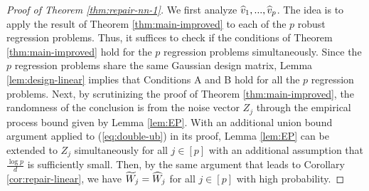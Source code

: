 \begin{proof}[Proof of Theorem \ref{thm:repair-nn-1}]
We first analyze $\widehat{v}_1,...,\widehat{v}_p$. The idea is to apply the result of Theorem \ref{thm:main-improved} to each of the $p$ robust regression problems. Thus, it suffices to check if the conditions of Theorem \ref{thm:main-improved} hold for the $p$ regression problems simultaneously. Since the $p$ regression problems share the same Gaussian design matrix, Lemma \ref{lem:design-linear} implies that Conditions A and B hold for all the $p$ regression problems. Next, by scrutinizing the proof of Theorem \ref{thm:main-improved}, the randomness of the conclusion is from the noise vector $Z_j$ through the empirical process bound given by Lemma \ref{lem:EP}. With an additional union bound argument applied to (\ref{eq:double-ub}) in its proof, Lemma \ref{lem:EP} can be extended to $Z_j$ simultaneously for all $j\in[p]$ with an additional assumption that $\frac{\log p}{d}$ is sufficiently small. Then, by the same argument that leads to Corollary \ref{cor:repair-linear}, we have $\widetilde{W}_j=\widehat{W}_j$ for all $j\in[p]$ with high probability.


\end{proof}
